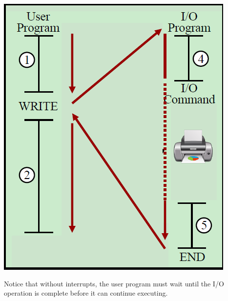 \documentclass{article}
\begin{document}
\begin{examplebox}
\begin{minipage}{0.65\textwidth}
\end{minipage}%
\hfill
\begin{minipage}{0.32\textwidth}
    \centering
    \includegraphics[width=\linewidth]{figures/Ch01Figure3.png}
    \label{fig:no_interrupts}
\end{minipage}

\vspace {0.5em}
Notice that without interrupts, the user program must wait until the I/O operation is complete before it can continue executing.
\end{examplebox}
\end{document}
